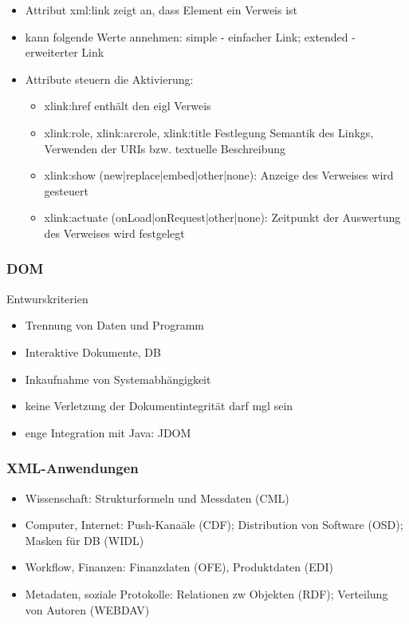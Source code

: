 \begin{itemize}
	\newpage
	\item Attribut xml:link zeigt an, dass Element ein Verweis ist
	\item kann folgende Werte annehmen: simple - einfacher Link; extended - erweiterter Link
	\item Attribute steuern die Aktivierung:
	\begin{itemize}
		\item xlink:href enthält den eigl Verweis
		\item xlink:role, xlink:arcrole, xlink:title Festlegung Semantik des Linkgs, Verwenden der URIs bzw. textuelle Beschreibung
		\item xlink:show (new|replace|embed|other|none): Anzeige des Verweises wird gesteuert
		\item xlink:actuate (onLoad|onRequest|other|none): Zeitpunkt der Auswertung des Verweises wird festgelegt
	\end{itemize}
\end{itemize}

\subsubsection{DOM}
Entwurskriterien
\begin{itemize}
	\item Trennung von Daten und Programm
	\item Interaktive Dokumente, DB
	\item Inkaufnahme von Systemabhängigkeit
	\item keine Verletzung der Dokumentintegrität darf mgl sein
	\item enge Integration mit Java: JDOM
\end{itemize}


\subsubsection{XML-Anwendungen}
\begin{itemize}
	\item Wissenschaft: Strukturformeln und Messdaten (CML)
	\item Computer, Internet: Push-Kanaäle (CDF); Distribution von Software (OSD); Masken für DB (WIDL)
	\item Workflow, Finanzen: Finanzdaten (OFE), Produktdaten (EDI)
	\item Metadaten, soziale Protokolle: Relationen zw Objekten (RDF); Verteilung von Autoren (WEBDAV)
\end{itemize}

